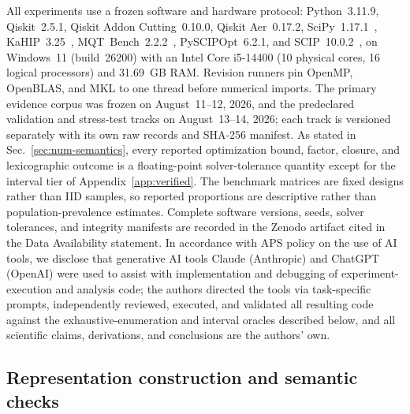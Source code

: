 \documentclass[
  aps,
  pra,
  reprint,
  amsmath,
  amssymb,
  longbibliography,
  nofootinbib,
  floatfix
]{revtex4-2}
\theoremstyle{plain}
\begin{document}
All experiments use a frozen software and hardware protocol: Python~3.11.9, Qiskit~2.5.1, Qiskit Addon Cutting~0.10.0, Qiskit Aer~0.17.2, SciPy~1.17.1~\cite{scipy}, KaHIP~3.25~\cite{kahip}, MQT~Bench~2.2.2~\cite{mqtbench}, PySCIPOpt~6.2.1, and SCIP~10.0.2~\cite{scip}, on Windows~11 (build~26200) with an Intel Core i5-14400 (10 physical cores, 16 logical processors) and 31.69~GB RAM. Revision runners pin OpenMP, OpenBLAS, and MKL to one thread before numerical imports. The primary evidence corpus was frozen on August~11--12, 2026, and the predeclared validation and stress-test tracks on August~13--14, 2026; each track is versioned separately with its own raw records and SHA-256 manifest. As stated in Sec.~\ref{sec:num-semantics}, every reported optimization bound, factor, closure, and lexicographic outcome is a floating-point solver-tolerance quantity except for the interval tier of Appendix~\ref{app:verified}. The benchmark matrices are fixed designs rather than IID samples, so reported proportions are descriptive rather than population-prevalence estimates. Complete software versions, seeds, solver tolerances, and integrity manifests are recorded in the Zenodo artifact cited in the Data Availability statement. In accordance with APS policy on the use of AI tools, we disclose that generative AI tools Claude (Anthropic) and ChatGPT (OpenAI) were used to assist with implementation and debugging of experiment-execution and analysis code; the authors directed the tools via task-specific prompts, independently reviewed, executed, and validated all resulting code against the exhaustive-enumeration and interval oracles described below, and all scientific claims, derivations, and conclusions are the authors' own.

\subsection{Representation construction and semantic checks}
\label{sec:rep-construction}
\end{document}
